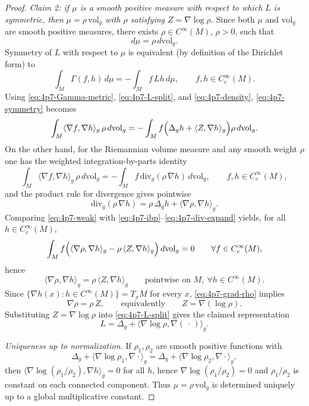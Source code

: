 \documentclass[11pt]{amsart}
\theoremstyle{definition}
\theoremstyle{remark}
\begin{document}
\begin{proof}
\smallskip
\noindent\emph{Claim 2: if $\mu$ is a smooth positive measure with respect to which $L$ is symmetric, then
$\mu=\rho\,\mathrm{vol}_g$ with $\rho$ satisfying $Z=\nabla\log\rho$.}
Since both $\mu$ and $\mathrm{vol}_g$ are smooth positive measures, there exists $\rho\in C^\infty(M)$, $\rho>0$, such that
\begin{equation}\label{eq:4p7-density}
d\mu=\rho\,d\mathrm{vol}_g .
\end{equation}
Symmetry of $L$ with respect to $\mu$ is equivalent (by definition of the Dirichlet form) to
\begin{equation}\label{eq:4p7-symmetry}
\int_M \Gamma(f,h)\,d\mu = -\int_M f\,Lh\,d\mu,
\qquad f,h\in C_c^\infty(M).
\end{equation}
Using \eqref{eq:4p7-Gamma-metric}, \eqref{eq:4p7-L-split}, and \eqref{eq:4p7-density}, \eqref{eq:4p7-symmetry} becomes
\begin{equation}\label{eq:4p7-weak}
\int_M \langle \nabla f,\nabla h\rangle_g\,\rho\,d\mathrm{vol}_g
=
-\int_M f\Bigl(\Delta_g h+\langle Z,\nabla h\rangle_g\Bigr)\rho\,d\mathrm{vol}_g .
\end{equation}
On the other hand, for the Riemannian volume measure and any smooth weight $\rho$ one has the weighted integration-by-parts identity
\begin{equation}\label{eq:4p7-ibp}
\int_M \langle \nabla f,\nabla h\rangle_g\,\rho\,d\mathrm{vol}_g
=
-\int_M f\,\mathrm{div}_g(\rho\,\nabla h)\,d\mathrm{vol}_g ,
\qquad f,h\in C_c^\infty(M),
\end{equation}
and the product rule for divergence gives pointwise
\begin{equation}\label{eq:4p7-div-expand}
\mathrm{div}_g(\rho\,\nabla h)=\rho\,\Delta_g h+\langle \nabla\rho,\nabla h\rangle_g .
\end{equation}
Comparing \eqref{eq:4p7-weak} with \eqref{eq:4p7-ibp}--\eqref{eq:4p7-div-expand} yields, for all $h\in C_c^\infty(M)$,
\[
\int_M f\Bigl(\langle \nabla\rho,\nabla h\rangle_g-\rho\,\langle Z,\nabla h\rangle_g\Bigr)\,d\mathrm{vol}_g=0
\qquad\forall f\in C_c^\infty(M),
\]
hence
\begin{equation}\label{eq:4p7-grad-rho}
\langle \nabla\rho,\nabla h\rangle_g=\rho\,\langle Z,\nabla h\rangle_g
\qquad\text{pointwise on }M,\ \forall h\in C^\infty(M).
\end{equation}
Since $\{\nabla h(x):h\in C^\infty(M)\}=T_xM$ for every $x$, \eqref{eq:4p7-grad-rho} implies
\[
\nabla\rho=\rho\,Z,
\qquad\text{equivalently}\qquad
Z=\nabla(\log\rho).
\]
Substituting $Z=\nabla\log\rho$ into \eqref{eq:4p7-L-split} gives the claimed representation
\[
L=\Delta_g+\langle \nabla\log\rho,\nabla(\,\cdot\,)\rangle_g .
\]

\smallskip
\noindent\emph{Uniqueness up to normalization.}
If $\rho_1,\rho_2$ are smooth positive functions with
\[
\Delta_g+\langle \nabla\log\rho_1,\nabla\cdot\rangle_g
=
\Delta_g+\langle \nabla\log\rho_2,\nabla\cdot\rangle_g,
\]
then $\langle \nabla\log(\rho_1/\rho_2),\nabla h\rangle_g=0$ for all $h$, hence $\nabla\log(\rho_1/\rho_2)=0$ and
$\rho_1/\rho_2$ is constant on each connected component. Thus $\mu=\rho\,\mathrm{vol}_g$ is determined uniquely up to a global multiplicative constant.
\end{proof}
\end{document}

